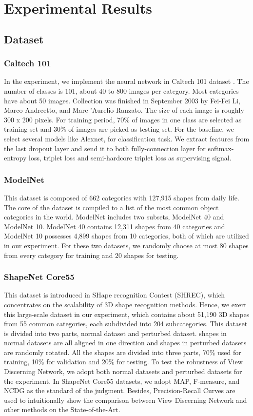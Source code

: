 \documentclass[11pt,onecolumn,letterpaper]{article}
\begin{document}
\section{Experimental Results}

\subsection{Dataset}
\subsubsection{Caltech 101}
In the experiment, we implement the neural network in Caltech 101 dataset \cite{griffin2007caltech}. The number of classes is 101, about 40 to 800 images per category. Most categories have about 50 images. Collection was finished in September 2003 by Fei-Fei Li, Marco Andreetto, and Marc 'Aurelio Ranzato. The size of each image is roughly 300 x 200 pixels. For training period, 70\% of images in one class are selected as training set and 30\% of images are picked as testing set. For the baseline, we select several models like Alexnet, for classification task. We extract features from the last dropout layer and send it to both fully-connection layer for softmax-entropy loss, triplet loss and semi-hardcore triplet loss as supervising signal.

\subsubsection{ModelNet}
This dataset is composed of 662 categories with 127,915 shapes from daily life. The core of the dataset is compiled to a list of the most common object categories in the world. ModelNet includes two subsets, ModelNet 40 and ModelNet 10. ModelNet 40 contains 12,311 shapes from 40 categories and ModelNet 10 possesses 4,899 shapes from 10 categories, both of which are utilized in our experiment. For these two datasets, we randomly choose at most 80 shapes from every category for training and 20 shapes for testing.

\subsubsection{ShapeNet Core55}
This dataset is introduced in SHape recognition Contest (SHREC), which concentrates on the scalability of 3D shape recognition methods. Hence, we exert this large-scale dataset in our experiment, which contains about 51,190 3D shapes from 55 common categories, each subdivided into 204 subcategories. This dataset is divided into two parts, normal dataset and perturbed dataset. shapes in normal datasets are all aligned in one direction and shapes in perturbed datasets are randomly rotated. All the shapes are divided into three parts, 70\% used for training, 10\% for validation and 20\% for testing.  To test the robustness of View Discerning Network, we adopt both normal datasets and perturbed datasets for the experiment. In ShapeNet Core55 datasets, we adopt MAP, F-measure, and NCDG as the standard of the judgment. Besides, Precision-Recall Curves are used to intuitionally show the comparison between View Discerning Network and other methods on the State-of-the-Art.
\end{document}
